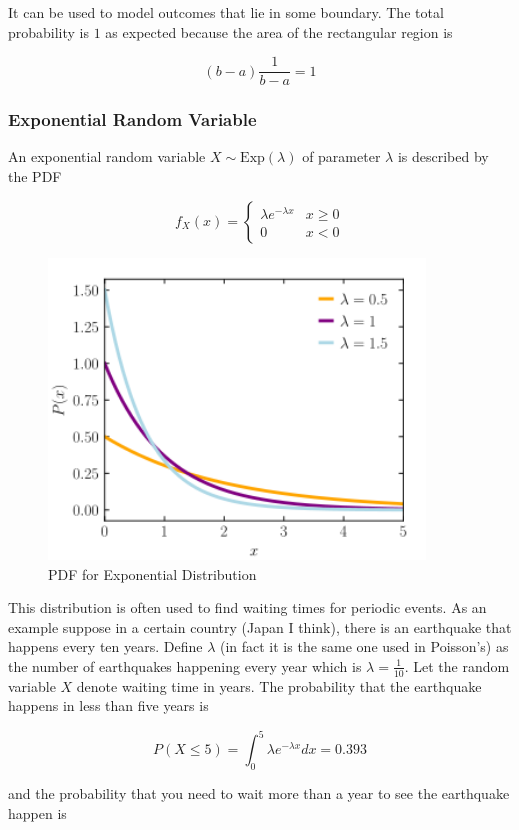 \documentclass[12pt, a4paper]{article}
\newcounter{exa}
\begin{document}
It can be used to model outcomes that lie in some boundary. The total probability is $1$ as expected because the area of the rectangular region is

$$(b-a)\frac{1}{b-a}=1$$

\subsubsection{Exponential Random Variable}

An exponential random variable $X\sim\text{Exp}(\lambda)$ of parameter $\lambda$ is described by the PDF

$$
f_X(x)=\begin{cases}
\lambda  e^{-\lambda x} & x \ge 0 \\
0 & x < 0
\end{cases}
$$

\begin{figure}[H]
\centering
\includegraphics[width=100mm]{14.png}
\caption{PDF for Exponential Distribution}
\end{figure}

This distribution is often used to find waiting times for periodic events. As an example suppose in a certain country (Japan I think), there is an earthquake that happens every ten years. Define $\lambda$ (in fact it is the same one used in Poisson's) as the number of earthquakes happening every year which is $\lambda=\frac{1}{10}$. Let the random variable $X$ denote waiting time in years. The probability that the earthquake happens in less than five years is

$$P(X\le5)=\int_0^5\lambda e^{-\lambda x}dx=0.393$$

and the probability that you need to wait more than a year to see the earthquake happen is
\end{document}
